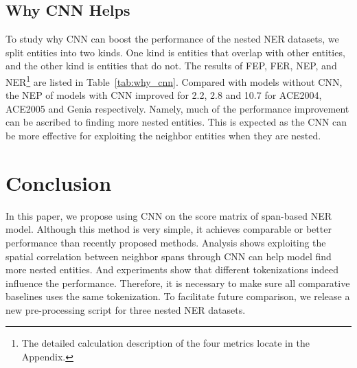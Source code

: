 \documentclass[11pt]{article}
\begin{document}
\subsection{Why CNN Helps} \label{sec:why_cnn_help}
To study why CNN can boost the performance of the nested NER datasets, we split entities into two kinds. One kind is entities that overlap with other entities, and the other kind is entities that do not. The results of FEP, FER, NEP, and NER\footnote{The detailed calculation description of the four metrics locate in the Appendix.} are listed in Table~\ref{tab:why_cnn}. Compared with models without CNN, the NEP of models with CNN improved for 2.2, 2.8 and 10.7 for ACE2004, ACE2005 and Genia respectively. Namely, much of the performance improvement can be ascribed to finding more nested entities. This is expected as the CNN can be more effective for exploiting the neighbor entities when they are nested.



\section{Conclusion}
In this paper, we propose using CNN on the score matrix of span-based NER model. Although this method is very simple, it achieves comparable or better performance than recently proposed methods. Analysis shows exploiting the spatial correlation between neighbor spans through CNN can help model find more nested entities. And experiments show that different tokenizations indeed influence the performance. Therefore, it is necessary to make sure all comparative baselines uses the same tokenization. To facilitate future comparison, we release a new pre-processing script for three nested NER datasets. 







\appendix
\end{document}
